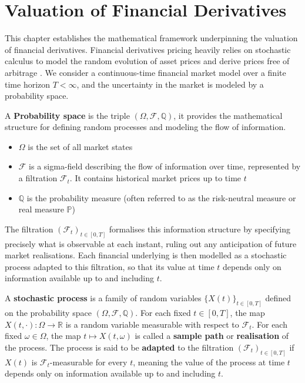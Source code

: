 \chapter{Valuation of Financial Derivatives}
    \noindent
    This chapter establishes the mathematical framework underpinning the valuation of financial derivatives. Financial derivatives pricing heavily relies on stochastic calculus to model the random evolution of asset prices and derive prices free of arbitrage \cite{hirsa2013introduction}. We consider a continuous-time financial market model over a finite time horizon $T < \infty$, and the uncertainty in the market is modeled by a  probability space.

    \begin{theorem} \label{thm:probability-space}
         A \textbf{Probability space} is the triple $(\Omega, \mathcal{F}, \mathbb{Q})$, it provides the mathematical structure for defining random processes and modeling the flow of information.
        \begin{itemize}
            \item $\Omega$ is the set of all market states
            \item $\mathcal{F}$ is a sigma-field describing the flow of information over time, represented by a filtration $\mathcal{F}_t$. It contains historical market prices up to time $t$
            \item $\mathbb{Q}$ is the probability measure (often referred to as the risk-neutral measure or real measure $\mathbb{P}$)
        \end{itemize}
    \end{theorem}
    
    \noindent
    The filtration $(\mathcal{F}_t)_{t \in [0,T]}$ formalises this information structure by specifying precisely what is observable at each instant, ruling out any anticipation of future market realisations. Each financial underlying is then modelled as a stochastic process adapted to this filtration, so that its value at time $t$ depends only on information available up to and including $t$. 

     \newpage
    \begin{definition} \label{def:stochastic-process} 
        A \textbf{stochastic process} is a family of random variables $\{X(t)\}_{t \in [0,T]}$ defined on the probability space $(\Omega, \mathcal{F}, \mathbb{Q})$. For each fixed $t \in [0,T]$, the map $X(t, \cdot) : \Omega \to \mathbb{R}$ is a random variable measurable with respect to $\mathcal{F}_t$. For each fixed $\omega \in \Omega$, the map $t \mapsto X(t, \omega)$ is called a \textbf{sample path} or \textbf{realisation} of the process. The process is said to be \textbf{adapted} to the filtration $(\mathcal{F}_t)_{t \in [0,T]}$ if $X(t)$ is $\mathcal{F}_t$-measurable for every $t$, meaning the value of the process at time $t$ depends only on information available up to and including $t$.
    \end{definition}

